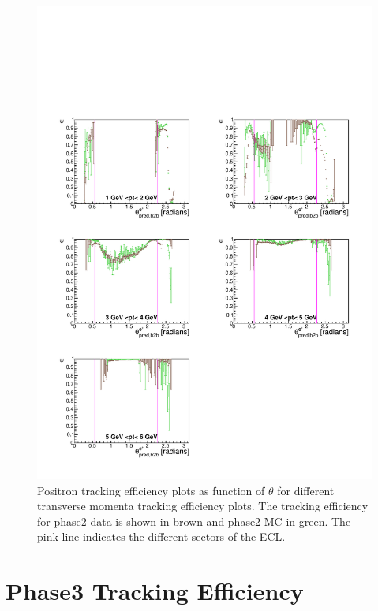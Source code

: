 \documentclass[a4paper,11pt,twosided,final,german,openbib,pdftex,listof=totoc,bibliography=totoc]{scrbook}
\begin{document}
\begin{figure}[!htbp]
	\centering
	\includegraphics[width=\textwidth]{Plots/master/xPtMThetaep}
	\caption[Transverse Momentum $\theta$ Positron Efficiency Phase2]{Positron tracking efficiency plots as function of $\theta$ for different transverse momenta tracking efficiency plots. The tracking efficiency for phase2 data is shown in brown and phase2 MC in green. The pink line indicates the different sectors of the ECL.}
	\label{plt:xPtMThetaep}
\end{figure}

\newpage














\chapter{Phase3 Tracking Efficiency}
\label{chp:TrackingEfficiencyPhase3}
\end{document}
